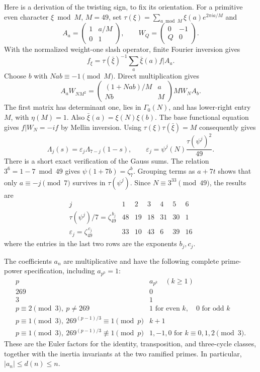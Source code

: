 Here is a derivation of the twisting sign, to fix its orientation.
For a primitive even character $\xi\bmod M$, $M=49$, set
$\tau(\xi)=\sum_{a\bmod M}\xi(a)e^{2\pi ia/M}$ and
\[
 A_a=\begin{pmatrix}1&a/M\\0&1\end{pmatrix},\qquad
 W_Q=\begin{pmatrix}0&-1\\Q&0\end{pmatrix}.
\]
With the normalized weight-one slash operator, finite Fourier inversion gives
\[ f_\xi=\tau(\bar\xi)^{-1}\sum_a\bar\xi(a)f|A_a. \]
Choose $b$ with $Nab\equiv-1\pmod M$. Direct multiplication gives
\[
 A_aW_{NM^2}=
 \begin{pmatrix}(1+Nab)/M&a\\Nb&M\end{pmatrix}M W_NA_b.
 \tag{S9}\label{seven:fricke-matrix}
\]
The first matrix has determinant one, lies in $\Gamma_0(N)$, and has
lower-right entry $M$, with $\eta(M)=1$.
Also $\bar\xi(a)=\xi(N)\xi(b)$.
The base functional equation gives $f|W_N=-if$ by Mellin inversion.
Using $\tau(\xi)\tau(\bar\xi)=M$ consequently gives
\[
 \Lambda_j(s)=\varepsilon_j\Lambda_{7-j}(1-s),\qquad
 \varepsilon_j=\psi^j(N)\frac{\tau(\psi^j)^2}{49}.
 \tag{S10}\label{seven:epsilon}
\]
There is a short exact verification of the Gauss sums.
The relation $3^6=1-7\bmod49$ gives
$\psi(1+7b)=\zeta_7^b$. Grouping terms as $a+7t$ shows that only
$a\equiv-j\pmod7$ survives in $\tau(\psi^j)$.
Since $N\equiv3^{33}\pmod{49}$, the results are
\[
\begin{array}{c|rrrrrr}
 j&1&2&3&4&5&6\\ \hline
 \tau(\psi^j)/7=\zeta_{49}^{\,b_j}
   &48&19&18&31&30&1\\
 \varepsilon_j=\zeta_{49}^{\,c_j}
   &33&10&43&6&39&16
\end{array}
 \tag{S11}\label{seven:gauss-table}
\]
where the entries in the last two rows are the exponents $b_j,c_j$.

The coefficients $a_n$ are multiplicative and have the following complete
prime-power specification, including $a_{p^0}=1$:
\[
\begin{array}{c|l}
 p& a_{p^k}\quad(k\ge1)\\ \hline
269&0\\
3&1\\
p\equiv2\pmod3,\ p\ne269
   &1\text{ for even }k,\quad0\text{ for odd }k\\
p\equiv1\pmod3,\ 269^{(p-1)/3}\equiv1\pmod p&k+1\\
p\equiv1\pmod3,\ 269^{(p-1)/3}\not\equiv1\pmod p
   &1,-1,0\text{ for }k\equiv0,1,2\pmod3 .
\end{array}
 \tag{S12}\label{seven:coefficients}
\]
These are the Euler factors for the identity, transposition, and
three-cycle classes, together with the inertia invariants at the two
ramified primes. In particular, $|a_n|\le d(n)\le n$.

